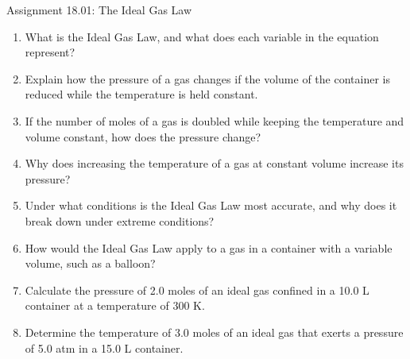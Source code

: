 \documentclass[letterpaper, 12pt]{article}
\begin{document}


\begin{center} Assignment 18.01: The Ideal Gas Law
\end{center}





\begin{enumerate}
	\item What is the Ideal Gas Law, and what does each variable in the equation represent?
	\vspace{0.5in}
	
	\item Explain how the pressure of a gas changes if the volume of the container is reduced while the temperature is held constant.
	\vspace{0.65in}
	
	\item If the number of moles of a gas is doubled while keeping the temperature and volume constant, how does the pressure change?
	\vspace{0.65in}
	
	\item Why does increasing the temperature of a gas at constant volume increase its pressure?
	\vspace{0.65in}
	
	\item Under what conditions is the Ideal Gas Law most accurate, and why does it break down under extreme conditions?
	\vspace{0.65in}
	
	\item How would the Ideal Gas Law apply to a gas in a container with a variable volume, such as a balloon?
	\vspace{0.65in}
	
	\item Calculate the pressure of 2.0 moles of an ideal gas confined in a 10.0 L container at a temperature of 300 K. 
	\vspace{0.65in}
	
	\item Determine the temperature of 3.0 moles of an ideal gas that exerts a pressure of 5.0 atm in a 15.0 L container. 
	\vspace{0.65in}
	

\end{enumerate}
\end{document}
